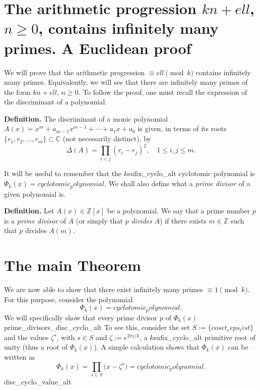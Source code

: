 \documentclass[a4paper, 12pt]{article}
\theoremstyle{definition}
\newcommand{\Z}{\mathbb{Z}}
\newcommand{\C}{\mathbb{C}}
\renewcommand\title{\textbf{The arithmetic progression ${k}n+{ell}$, $n\geqslant0$, contains infinitely many primes.\\ A Euclidean proof}}
\begin{document}
\thispagestyle{plain}
\sloppy
\section{The arithmetic progression ${k}n+{ell}$, $n\geqslant0$, contains infinitely many primes. A Euclidean proof}

We will prove that the arithmetic progression $\equiv {ell} \pmod{{k}}$ contains infinitely many primes. Equivalently, we will see that there are infinitely many primes of the form ${k}n+{ell}$, $n\geqslant0$. To follow the proof, one must recall the expression of the discriminant of a polynomial. 

\textbf{Definition.} The discriminant of a monic polynomial $A(x)=x^m+a_{m-1}x^{m-1}+\cdots+a_1x+a_0$ is given, in terms of its roots $\{r_1,r_2,\dots,r_m\}\subset\C$ (not necessarily distinct), by
\begin{equation}\label{eq:discrim}
	\Delta(A)=\prod_{i<j}(r_i-r_j)^2, \quad 1\leqslant i,j\leqslant m.
\end{equation}

It will be useful to remember that the ${k}${sufix_cyclo_alt} cyclotomic polynomial is $\Phi_{{k}}(x)={cyclotomic_polynomial}$. We shall also define what a \emph{prime divisor} of a given polynomial is.

\textbf{Definition.} Let $A(x)\in\Z[x]$ be a polynomial. We say that a prime number $p$ is a \emph{prime divisor} of $A$ (or simply that $p$ \emph{divides} $A$) if there exists $m\in\Z$ such that $p$ divides $A(m)$.

\section{The main Theorem}\label{sec:mainTh}

We are now able to show that there exist infinitely many primes $\equiv 1\pmod{{k}}$. For this purpose, consider the polynomial 
\begin{equation*}
\Phi_{{k}}(x)={cyclotomic_polynomial}.
\end{equation*}
We will specifically show that every prime divisor $p$ of $\Phi_{{k}}(x)$ {prime_divisors_disc_cyclo_alt} To see this, consider the set $S:=\{{coset_reps_list}\}$ and the values $\zeta^{s}$, with $s\in S$ and $\zeta:=e^{2\pi i/{{k}}}$, a ${k}${sufix_cyclo_alt} primitive root of unity (thus a root of $\Phi_{{k}}(x)$). A simple calculation shows that $\Phi_{{k}}(x)$ can be written as
\begin{equation*}
\Phi_{{k}}(x)=\prod_{s\in S}\big(x-\zeta^{s}\big)={cyclotomic_polynomial}.
\end{equation*}
{disc_cyclo_value_alt}
\end{document}
